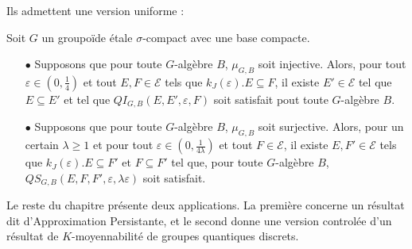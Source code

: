 Ils admettent une version uniforme :
\begin{thmfr} Soit $G$ un groupoïde étale $\sigma$-compact avec une base compacte. \\
\begin{itemize}
\item[$\bullet$] Supposons que pour toute $G$-algèbre $B$, $\mu_{G,B}$ soit injective. Alors, pour tout $\varepsilon\in (0,\frac{1}{4})$ et tout $E,F\in\mathcal E$ tels que $k_J(\varepsilon). E\subseteq F$, il existe $E'\in\mathcal E$ tel que $E\subseteq E'$ et tel que $QI_{G,B}(E,E',\varepsilon,F)$ soit satisfait pout toute $G$-algèbre $B$.\\
\item[$\bullet$] Supposons que pour toute $G$-algèbre $B$, $\mu_{G,B}$ soit surjective. Alors, pour un certain $\lambda \geq 1$ et pour tout $\varepsilon\in (0,\frac{1}{4\lambda})$ et tout $F\in\mathcal E$, il existe $E,F'\in\mathcal E$ tels que $k_J(\varepsilon). E\subseteq F'$ et $F\subseteq F'$ tel que, pour toute $G$-algèbre $B$, $QS_{G,B}(E, F,F',\varepsilon,\lambda \varepsilon)$ soit satisfait.
\end{itemize}
\end{thmfr}

Le reste du chapitre présente deux applications. La première concerne un résultat dit d'Approximation Persistante, et le second donne une version controlée d'un résultat de $K$-moyennabilité de groupes quantiques discrets. \\

